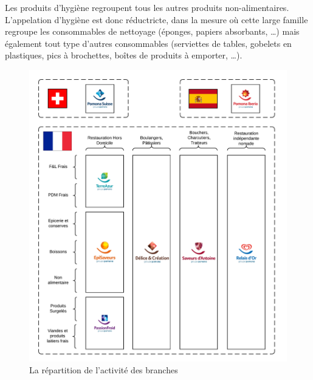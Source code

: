                 Les produits d'hygiène regroupent tous les autres produits non-alimentaires.
                L'appelation \og d'hygiène \fg est donc réductricte, dans la mesure où cette large famille regroupe les consommables de nettoyage (éponges, papiers absorbants, \dots) mais également tout type d'autres consommables (serviettes de tables, gobelets en plastiques, pics à brochettes, boîtes de produits à emporter, \dots).


                \begin{figure}[htpb]
                    \begin{center}
                    \includegraphics[width=\linewidth]{img/La répartition de l'activité des branches.png}
                    \end{center}
                    \caption{La répartition de l'activité des branches}
                    \label{fig:repartition_activite}
                \end{figure}


